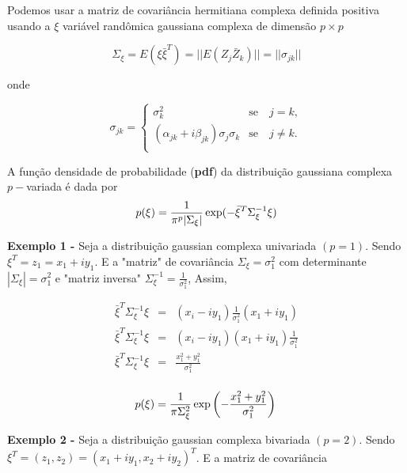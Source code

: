 Podemos usar a matriz de covariância hermitiana complexa definida positiva usando a $\xi$ variável randômica gaussiana complexa de dimensão $p\times p$

$$\Sigma_{\xi}=E(\xi\bar{\xi}^{T})=||E(Z_j\bar{Z}_k)||=||\sigma_{jk}||$$

onde

$$
\sigma_{jk} = \left\{
\begin{array}{cc}
	\sigma_k^2                                & \mbox{se}\quad j=k,  \\
	(\alpha_{jk}+i\beta_{jk})\sigma_j\sigma_k & \mbox{se}\quad j\neq k. \\
\end{array}
\right.
$$

A função densidade de probabilidade ({\bf pdf}) da distribuição gaussiana complexa $p-$variada é dada por
\begin{equation}\label{eqn69}
	p(\xi)=\frac{1}{\pi^p|\Sigma_{\xi}|}\exp(-\bar{\xi}^{T}\Sigma_{\xi}^{-1}\xi)  \\
\end{equation}


{\bf Exemplo 1 -} Seja a distribuição gaussian complexa univariada $(p=1)$. Sendo $\xi^{T}=z_1=x_1+iy_1$. E a "matriz" de covariância $\Sigma_{\xi}=\sigma_{1}^{2}$ com determinante $|\Sigma_{\xi}|=\sigma_{1}^{2}$ e  "matriz inversa" $\Sigma_{\xi}^{-1}=\frac{1}{\sigma_{1}^{2}}$, Assim,

\begin{equation}\label{eqn70}
\begin{array}{ccc}
	\bar{\xi}^{T}\Sigma_{\xi}^{-1}\xi&=&(x_i-iy_1)\frac{1}{\sigma_1^2}(x_1+iy_1)  \\
	\bar{\xi}^{T}\Sigma_{\xi}^{-1}\xi&=&(x_i-iy_1)(x_1+iy_1)\frac{1}{\sigma_1^2}  \\
	\bar{\xi}^{T}\Sigma_{\xi}^{-1}\xi&=&\frac{x_1^2+y_1^2}{\sigma_1^2}  \\
\end{array}
\end{equation}


\begin{equation}\label{eqn71}
	p(\xi)=\frac{1}{\pi\Sigma_{\xi}^{2}}\exp\left(-\frac{x_1^2+y_1^2}{\sigma_1^2}\right)  \\
\end{equation}

{\bf Exemplo 2 -} Seja a distribuição gaussian complexa bivariada $(p=2)$. Sendo $\xi^{T}=(z_1, z_2)=(x_1 + iy_1, x_2 + iy_2)^{T}$. E a matriz de covariância 


